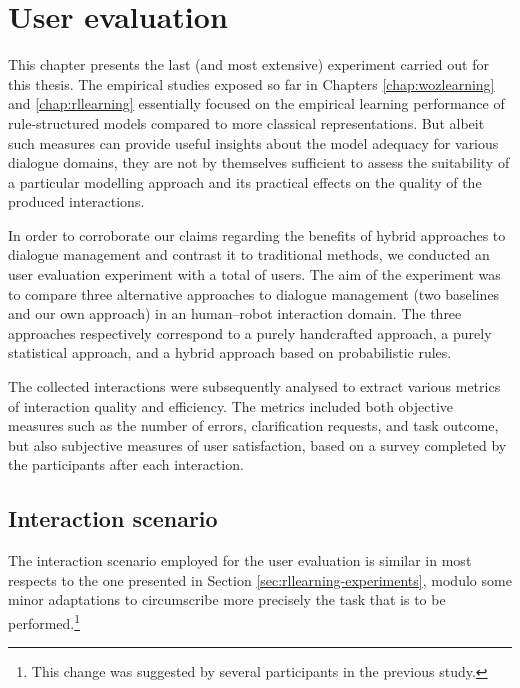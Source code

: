 \chapter{User evaluation}
\label{chap:user-evaluation}


This chapter presents the last (and most extensive) experiment carried out for this thesis. The empirical studies exposed so far in Chapters \ref{chap:wozlearning} and \ref{chap:rllearning} essentially focused on the empirical learning performance of rule-structured models compared to more classical representations. But albeit such measures can provide useful insights about the model adequacy for various dialogue domains, they are not by themselves sufficient to assess the suitability of a particular modelling approach and its practical effects on the quality of the produced interactions. 

In order to corroborate our claims regarding the benefits of hybrid approaches to dialogue management and contrast it to traditional methods, we conducted an user evaluation experiment with a total of  users. The aim of the experiment was to compare three alternative approaches to dialogue management (two baselines and our own approach) in an human--robot interaction domain.  The three approaches respectively correspond to a purely handcrafted approach, a purely statistical approach, and a hybrid approach based on probabilistic rules. 

The collected interactions were subsequently analysed to extract various metrics of interaction quality and efficiency.  The metrics included both objective measures such as the number of errors, clarification requests, and task outcome, but also subjective measures of user satisfaction, based on a survey completed by the participants after each interaction. 


\section{Interaction scenario}

The interaction scenario employed for the user evaluation is similar in most respects to the one presented in Section \ref{sec:rllearning-experiments}, modulo some minor adaptations to circumscribe more precisely the task that is to be performed.\footnote{This change was suggested by several participants in the previous study.} 

